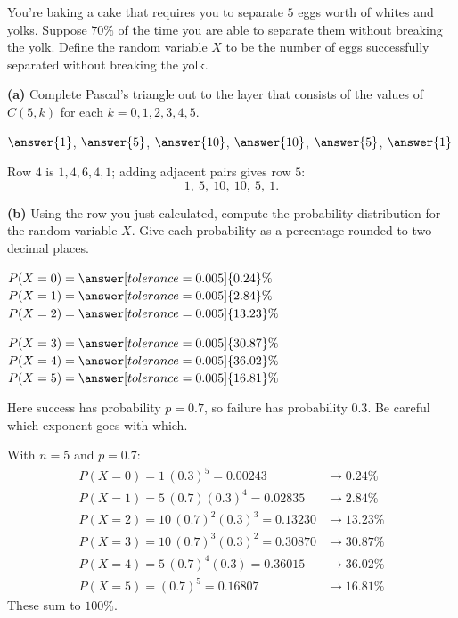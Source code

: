 \documentclass[12pt]{ximera}
\begin{document}
\begin{problem}
You're baking a cake that requires you to separate $5$ eggs worth of whites and
yolks. Suppose $70\%$ of the time you are able to separate them without breaking the
yolk. Define the random variable $X$ to be the number of eggs successfully separated
without breaking the yolk.

\begin{prompt}
\textbf{(a)} Complete Pascal's triangle out to the layer that consists of the values
of $C(5,k)$ for each $k=0,1,2,3,4,5$.

$\answer{1}$, $\answer{5}$, $\answer{10}$, $\answer{10}$, $\answer{5}$, $\answer{1}$

\begin{feedback}
Row $4$ is $1, 4, 6, 4, 1$; adding adjacent pairs gives row $5$:
\[ 1,\ 5,\ 10,\ 10,\ 5,\ 1. \]
\end{feedback}
\end{prompt}

\begin{prompt}
\textbf{(b)} Using the row you just calculated, compute the probability distribution
for the random variable $X$. Give each probability as a percentage rounded to two
decimal places.

$P(X=0)=\answer[tolerance=0.005]{0.24}\%$ \qquad
$P(X=1)=\answer[tolerance=0.005]{2.84}\%$ \qquad
$P(X=2)=\answer[tolerance=0.005]{13.23}\%$

\smallskip
$P(X=3)=\answer[tolerance=0.005]{30.87}\%$ \qquad
$P(X=4)=\answer[tolerance=0.005]{36.02}\%$ \qquad
$P(X=5)=\answer[tolerance=0.005]{16.81}\%$

\begin{hint}
Here success has probability $p=0.7$, so failure has probability $0.3$. Be careful
which exponent goes with which.
\end{hint}

\begin{feedback}
With $n=5$ and $p=0.7$:
\[
\begin{array}{ll}
P(X=0)=1\,(0.3)^5=0.00243 & \to 0.24\%\\
P(X=1)=5\,(0.7)(0.3)^4=0.02835 & \to 2.84\%\\
P(X=2)=10\,(0.7)^2(0.3)^3=0.13230 & \to 13.23\%\\
P(X=3)=10\,(0.7)^3(0.3)^2=0.30870 & \to 30.87\%\\
P(X=4)=5\,(0.7)^4(0.3)=0.36015 & \to 36.02\%\\
P(X=5)=(0.7)^5=0.16807 & \to 16.81\%
\end{array}
\]
These sum to $100\%$. \checkmark


\end{feedback}
\end{prompt}
\end{problem}
\end{document}
